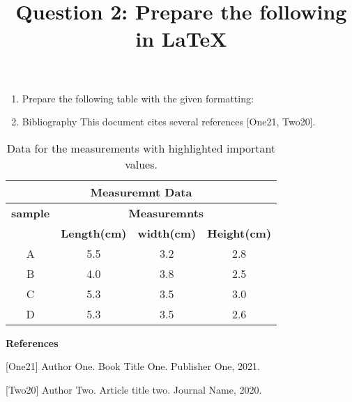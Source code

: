 \documentclass{article}
\title{\textbf{Question 2: Prepare the following in \hspace{0.1cm} \LaTeX}}
\begin{document}
	\maketitle
	\begin{enumerate}
		\item Prepare the following table with the given formatting:
		\item Bibliography
		This document cites several references [One21, Two20].
	\end{enumerate}
	\begin{table}[h]
		\centering
		\begin{tabular}{|c|c|c|c|}
			\hline
			\multicolumn{4}{|c|}{\textbf{Measuremnt Data}}\\
			\hline
			\cline{1-1}
			\textbf{sample}&\multicolumn{3}{|c|}{\textbf{Measuremnts}}\\
			
			\cline{2-4}
			& \textbf{Length(cm)}&\textbf{width(cm)}&\textbf{Height(cm)}\\
			\hline
			A&5.5&3.2&\cellcolor{yellow}2.8\\
			\hline
			B&4.0&\cellcolor{blue}3.8&2.5\\
			\hline
			C&5.3&3.5&\cellcolor{green}3.0\\
			\hline
			D&\cellcolor{red}5.3&3.5&2.6\\
			\hline
			
			
			
			
			
		\end{tabular}
		\caption{ Data for the measurements with highlighted important values.}
	\end{table}
	
	\textbf {References}
	
	\vspace{0.5cm}
	
	[One21] Author One. Book Title One. Publisher One, 2021.
	
	[Two20] Author Two. Article title two. Journal Name, 2020.
	
\end{document}
